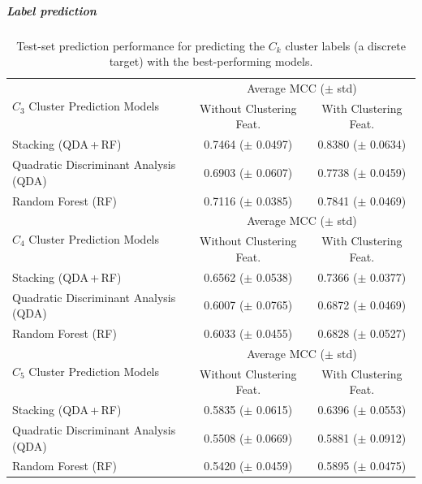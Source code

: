 \documentclass[sn-basic, Numbered]{sn-jnl} %
\begin{document}
\subparagraph{Label prediction}

\begin{table}[tb]
  \centering
  \caption{Test-set prediction performance for predicting the $C_k$ cluster labels (a discrete target) with the best-performing models.}
  \label{tab:cluster-prediction}
  \begin{tabular}{lcc}
    \toprule
    \multirow[c]{2}{*}[-0.27em]{$C_3$ Cluster Prediction Models} & \multicolumn{2}{c}{Average MCC ($\pm$ std)} \\
    \cmidrule(lr){2-3}
    & {Without Clustering Feat.} & {With Clustering Feat.} \\
    \midrule
    Stacking (QDA\,+\,RF)                 & 0.7464 ($\pm$ 0.0497) & 0.8380 ($\pm$ 0.0634) \\[0.4ex]
    Quadratic Discriminant Analysis (QDA)                     & 0.6903 ($\pm$ 0.0607) & 0.7738 ($\pm$ 0.0459) \\[0.4ex]
    Random Forest (RF)         & 0.7116 ($\pm$ 0.0385) & 0.7841 ($\pm$ 0.0469) \\[0.4ex]
    \midrule
    \multirow[c]{2}{*}[-0.27em]{$C_4$ Cluster Prediction Models} & \multicolumn{2}{c}{Average MCC ($\pm$ std)} \\
    \cmidrule(lr){2-3}
    & {Without Clustering Feat.} & {With Clustering Feat.} \\
    \midrule
    Stacking (QDA\,+\,RF)                 & 0.6562 ($\pm$ 0.0538) & 0.7366 ($\pm$ 0.0377) \\[0.4ex]
    Quadratic Discriminant Analysis (QDA)                     & 0.6007 ($\pm$ 0.0765) & 0.6872 ($\pm$ 0.0469) \\[0.4ex]
    Random Forest (RF)         & 0.6033 ($\pm$ 0.0455) & 0.6828 ($\pm$ 0.0527) \\[0.4ex]
    \midrule
    \multirow[c]{2}{*}[-0.27em]{$C_5$ Cluster Prediction Models} & \multicolumn{2}{c}{Average MCC ($\pm$ std)} \\
    \cmidrule(lr){2-3}
    & {Without Clustering Feat.} & {With Clustering Feat.} \\
    \midrule
    Stacking (QDA\,+\,RF)                 & 0.5835 ($\pm$ 0.0615) & 0.6396 ($\pm$ 0.0553) \\[0.4ex]
    Quadratic Discriminant Analysis (QDA)                      & 0.5508 ($\pm$ 0.0669) & 0.5881 ($\pm$ 0.0912) \\[0.4ex]
    Random Forest (RF)         & 0.5420 ($\pm$ 0.0459) & 0.5895 ($\pm$ 0.0475) \\
    \bottomrule
  \end{tabular}
\end{table}
\end{document}
